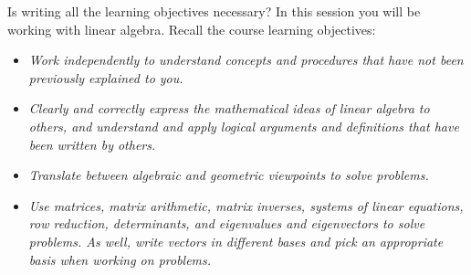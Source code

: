 \documentclass[red]{tutorial}
\theoremstyle{definition}
\theoremstyle{theorem}
\begin{document}
\begin{tutorial}
  \begin{objectives} Is writing all the learning objectives necessary?
    In this session you will be working with linear algebra.
    Recall the course learning objectives:
    \begin{itemize}
      \item
        \emph{Work independently to understand concepts
        and procedures that have not been previously explained to you.}
      \item
        \emph{Clearly and correctly express the mathematical ideas of linear
        algebra to others, and understand and apply logical arguments and
        definitions that have been written by others.}
      \item
        \emph{Translate between algebraic and geometric viewpoints to solve
        problems.}
      \item
        \emph{Use matrices, matrix arithmetic, matrix
        inverses, systems of linear equations, row reduction,
        determinants, and eigenvalues and eigenvectors
        to solve problems. As well, write vectors in different
        bases and pick an appropriate basis when working on problems.}
    \end{itemize}
  \end{objectives}


\end{tutorial}
\end{document}
